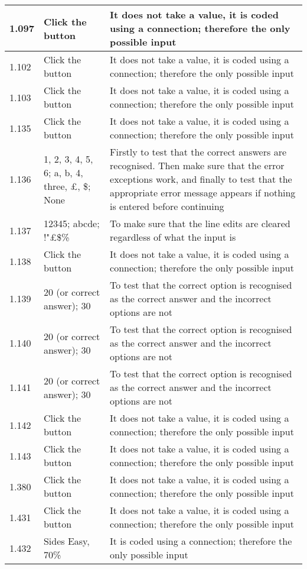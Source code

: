 \begin{landscape}
\begin{center}
\begin{longtable}{|p{4cm}|p{4cm}|p{5cm}|}
1.097 & Click the button & It does not take a value, it is coded using a connection; therefore the only possible input \\ \hline
1.102 & Click the button & It does not take a value, it is coded using a connection; therefore the only possible input \\ \hline
1.103 & Click the button & It does not take a value, it is coded using a connection; therefore the only possible input \\ \hline
1.135 & Click the button & It does not take a value, it is coded using a connection; therefore the only possible input \\ \hline
1.136 & 1, 2, 3, 4, 5, 6; a, b, 4, three, £, \$; None & Firstly to test that the correct answers are recognised. Then make sure that the error exceptions work, and finally to test that the appropriate error message appears if nothing is entered before continuing \\ \hline
1.137 & 12345; abcde; !"£\$\% & To make sure that the line edits are cleared regardless of what the input is \\ \hline
1.138 & Click the button & It does not take a value, it is coded using a connection; therefore the only possible input \\ \hline
1.139 & 20 (or correct answer); 30 & To test that the correct option is recognised as the correct answer and the incorrect options are not \\ \hline
1.140 & 20 (or correct answer); 30 & To test that the correct option is recognised as the correct answer and the incorrect options are not \\ \hline
1.141 & 20 (or correct answer); 30 & To test that the correct option is recognised as the correct answer and the incorrect options are not \\ \hline
1.142 & Click the button & It does not take a value, it is coded using a connection; therefore the only possible input \\ \hline
1.143 & Click the button & It does not take a value, it is coded using a connection; therefore the only possible input \\ \hline
1.380 & Click the button & It does not take a value, it is coded using a connection; therefore the only possible input \\ \hline
1.431 & Click the button & It does not take a value, it is coded using a connection; therefore the only possible input \\ \hline
1.432 & Sides Easy, 70\% & It is coded using a connection; therefore the only possible input \\ \hline

\end{longtable}
\end{center}
\end{landscape}
